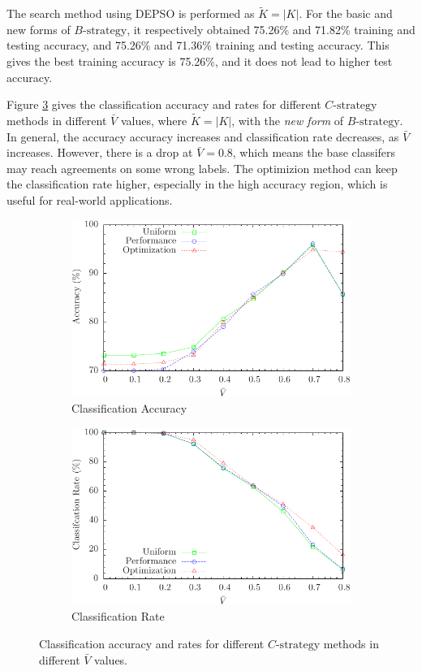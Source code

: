 The search method using DEPSO is performed as $\tilde{K}=|K|$. For the basic and new forms of $B\text{-strategy}$, it respectively obtained 75.26\% and 71.82\% training and testing accuracy, and 75.26\% and 71.36\% training and testing accuracy. This gives the best training accuracy is 75.26\%, and it does not lead to higher test accuracy. 

Figure \ref{fig:threshoulds} gives the classification accuracy and rates for different $C\text{-strategy}$ methods in different $\bar{V}$ values, where $\tilde{K}=|K|$, with the \emph{new form} of $B\text{-strategy}$. In general, the accuracy accuracy increases and classification rate decreases, as $\bar{V}$ increases. However, there is a drop at $\bar{V}=0.8$, which means the base classifers may reach agreements on some wrong labels. The optimizion method can keep the classification rate higher, especially in the high accuracy region, which is useful for real-world applications.

\begin{figure} [t]
\centering
\begin{subfigure}{.45\textwidth}
  \centering
  \includegraphics[width=.95\linewidth]{../Figure/threshould_accuracy}
  \caption{Classification Accuracy}
  \label{fig:threshould_accuracy}
\end{subfigure}%
\begin{subfigure}{.45\textwidth}
  \centering
  \includegraphics[width=.95\linewidth]{../Figure/threshould_rate}
  \caption{Classification Rate}
  \label{fig:threshould_rate}
\end{subfigure}
\caption{Classification accuracy and rates for different $C\text{-strategy}$ methods in different $\bar{V}$ values.}
\label{fig:threshoulds}
\end{figure}

